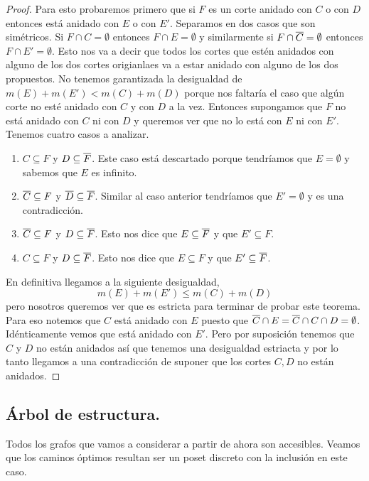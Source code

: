 \documentclass[tesis.tex]{subfiles}
\begin{document}
\begin{proof}
	Para esto probaremos primero que si $F$ es un corte anidado con $C$ o con $D$ entonces está anidado con $E$ o con $E'$.
	Separamos en dos casos que son simétricos.
	Si $F \cap C = \emptyset$ entonces $F \cap E= \emptyset$ y similarmente si $F \cap \overline C = \emptyset$ entonces $F \cap E' = \emptyset$.
	Esto nos va a decir que todos los cortes que estén anidados con alguno de los dos cortes origianlaes va a estar anidado con alguno de los dos propuestos.
	No tenemos garantizada la desigualdad de $m(E) + m(E') < m(C) + m(D)$ porque nos faltaría el caso que algún corte no esté anidado con $C$ y con $D$ a la vez.
	Entonces supongamos que $F$ no está anidado con $C$ ni con $D$ y queremos ver que no lo está con $E$ ni con $E'$.
	Tenemos cuatro casos a analizar.
	\begin{enumerate}
		\item $C \subseteq F$ y $D \subseteq \overline F$.
		Este caso está descartado porque tendríamos que $E=\emptyset$ y sabemos que $E$ es infinito. 
		\item $\overline C \subseteq F$ y $\overline D \subseteq \overline F$.
		Similar al caso anterior tendríamos que $E' = \emptyset$ y es una contradicción.
		\item $\overline C \subseteq F$ y $D \subseteq \overline F$.
		Esto nos dice que $E \subseteq \overline F$ y que $E' \subseteq F$.
		\item $ C \subseteq F$ y $D \subseteq \overline F$.
		Esto nos dice que $E \subseteq F$ y que $E' \subseteq \overline F$.
	\end{enumerate}
	En definitiva llegamos a la siguiente desigualdad,
	\[
		m(E) + m(E') \le m(C) + m(D)
	\]
	pero nosotros queremos ver que es estricta para terminar de probar este teorema.
	Para eso notemos que $C$ está anidado con $E$ puesto que $\overline C \cap E = \overline C \cap C \cap D = \emptyset$.
	Idénticamente vemos que está anidado con $E'$.
	Pero por suposición tenemos que $C$ y $D$ no están anidados así que tenemos una desigualdad estriacta y por lo tanto llegamos a una contradicción de suponer que los cortes $C,D$ no están anidados.
\end{proof}

\subsection{Árbol de estructura.}

Todos los grafos que vamos a considerar a partir de ahora son accesibles.
Veamos que los caminos óptimos resultan ser un poset discreto con la inclusión en este caso.
\end{document}
